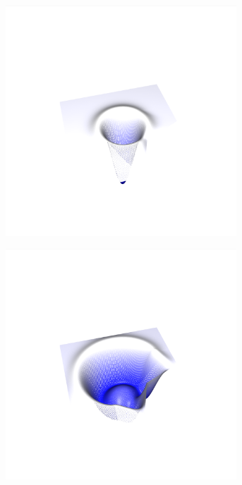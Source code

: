 \documentclass[crop=false,10pt,ngerman]{standalone}
\begin{document}
\begin{figure}[p]
\begin{subfigure}[b]{0.24\textwidth}
          \caption{}
        \end{subfigure}
        \begin{subfigure}[b]{0.24\textwidth}
          \center
          \includegraphics[trim={4cm 1.2cm 4.5cm 1.5cm},clip,width=0.95\textwidth]{images/test_wave_2.png}
          \caption{}
        \end{subfigure}
        \begin{subfigure}[b]{0.24\textwidth}
          \center
          \includegraphics[trim={4cm 1.2cm 4.5cm 1.5cm},clip,width=0.95\textwidth]{images/test_wave_3.png}
          \caption{}
        \end{subfigure}


\end{figure}
\end{document}
